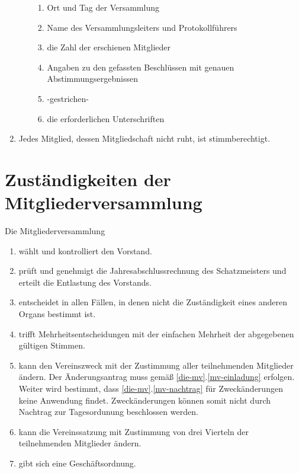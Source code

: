 \documentclass[a4paper, 12pt]{scrartcl}
\begin{document}
\begin{enumerate}
\begin{enumerate}
\begin{enumerate}
	  		\item Ort und Tag der Versammlung
	    	\item Name des Versammlungsleiters und Protokollführers
	    	\item die Zahl der erschienen Mitglieder
	    	\item Angaben zu den gefassten Beschlüssen mit genauen Abstimmungsergebnissen
	    	\item -gestrichen-
	    	\item die erforderlichen Unterschriften
			\end{enumerate}
		\end{enumerate}
	\item Jedes Mitglied, dessen Mitgliedschaft nicht ruht, ist stimmberechtigt.
\end{enumerate}

\section{Zuständigkeiten der Mitgliederversammlung}
Die Mitgliederversammlung
\begin{enumerate}
	\item wählt und kontrolliert den Vorstand.
	\item prüft und genehmigt die Jahresabschlussrechnung des Schatzmeisters und erteilt die Entlastung des Vorstands.
	\item entscheidet in allen Fällen, in denen nicht die Zuständigkeit eines anderen Organs bestimmt ist.
	\item trifft Mehrheitsentscheidungen mit der einfachen Mehrheit der abgegebenen gültigen Stimmen.
	\item kann den Vereinszweck mit der Zustimmung aller teilnehmenden Mitglieder ändern. Der Änderungsantrag muss gemäß \ref{die-mv}.\ref{mv-einladung} erfolgen. Weiter wird bestimmt, dass \ref{die-mv}.\ref{mv-nachtrag} für Zweckänderungen keine Anwendung findet. Zweckänderungen können somit nicht durch Nachtrag zur Tagesordunung beschlossen werden.
	\item kann die Vereinssatzung mit Zustimmung von drei Vierteln der teilnehmenden Mitglieder ändern. 
	\item gibt sich eine Geschäftsordnung.
\end{enumerate}
\end{document}

